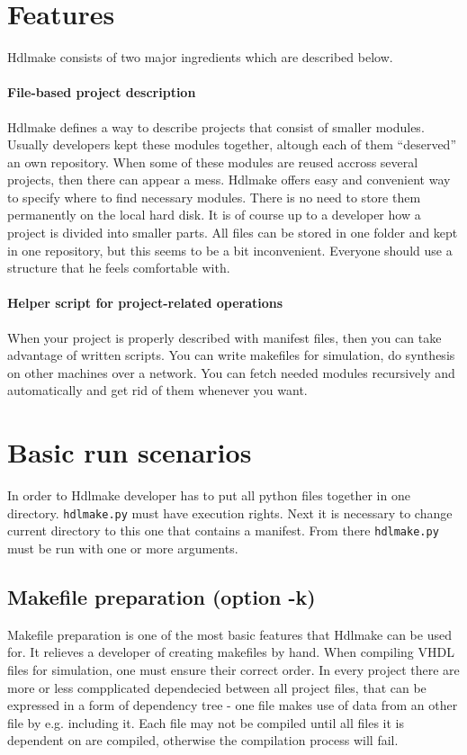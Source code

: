 \documentclass[a4paper,11pt]{article}
\begin{document}
\section{Features}
Hdlmake consists of two major ingredients which are described below.
\paragraph*{File-based project description}
Hdlmake defines a way to describe projects that consist of smaller modules. Usually developers kept these modules together, altough each of them ``deserved'' an own repository. When some of these modules are reused accross several projects, then there can appear a mess. Hdlmake offers easy and convenient way to specify where to find necessary modules. There is no need to store them permanently on the local hard disk.
It is of course up to a developer how a project is divided into smaller parts. All files can be stored in one folder and kept in one repository, but this seems to be a bit inconvenient. Everyone should use a structure that he feels comfortable with.

\paragraph*{Helper script for project-related operations}
When your project is properly described with manifest files, then you can take advantage of written scripts. You can write makefiles for simulation, do synthesis on other machines over a network. You can fetch needed modules recursively and automatically and get rid of them whenever you want.
\section{Basic run scenarios}
In order to Hdlmake developer has to put all python files together in one directory. \verb!hdlmake.py! must have execution rights. Next it is necessary to change current directory to this one that contains a manifest. From there \verb!hdlmake.py! must be run with one or more arguments.
\subsection*{Makefile preparation (option -k)}
Makefile preparation is one of the most basic features that Hdlmake can be used for. It relieves a developer of creating makefiles by hand. When compiling VHDL files for simulation, one must ensure their correct order. In every project there are more or less compplicated dependecied between all project files, that can be expressed in a form of dependency tree - one file makes use of data from an other file by e.g. including it. Each file may not be compiled until all files it is dependent on are compiled, otherwise the compilation process will fail.
\end{document}
